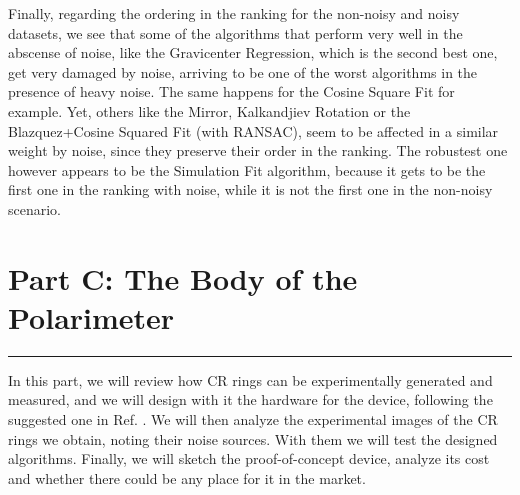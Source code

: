 \documentclass[11pt, a4paper, twoside]{article} %
\begin{document}
Finally, regarding the ordering in the ranking for the non-noisy and noisy datasets, we see that some of the algorithms that perform very well in the abscense of noise, like the Gravicenter Regression, which is the second best one, get very damaged by  noise, arriving to be one of the worst algorithms in the presence of heavy noise. The same happens for the Cosine Square Fit for example. Yet, others like the Mirror, Kalkandjiev Rotation or the Blazquez+Cosine Squared Fit (with RANSAC), seem to be affected in a similar weight by noise, since they preserve their order in the ranking. The robustest one however appears to be the Simulation Fit algorithm, because it gets to be the first one in the ranking with noise, while it is not the first one in the non-noisy scenario.


\newpage
\fancyhead[L]{\null}
\fancyhead[R]{\null}


\newpage

%


\section*{\centering \huge{Part C: The Body of the Polarimeter}\vspace{-0.3cm}}
\noindent\rule{\textwidth}{0.4pt}

In this part, we will review how CR rings can be experimentally generated and measured, and we will design with it the hardware for the device, following the suggested one in Ref. \cite{incomplete}. We will then analyze the experimental images of the CR rings we obtain, noting their noise sources. With them we will test the designed algorithms. Finally, we will sketch the proof-of-concept device, analyze its cost and whether there could be any place for it in the market.\vspace{-0.4cm}
\end{document}
